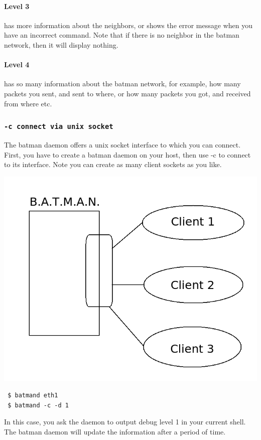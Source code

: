 \documentclass[
	12pt,
	a4paper,
	twoside,
	english,
	headsepline,
	footnosepline,
	automark,
	normalheadings,
	openany,
	cleardoubleplain,
	abstracton,
	idxtotoc,
	liststotoc,
	bibtotoc,
 	BCOR8mm,
]{scrartcl}
\newcommand{\subsubsectionttt}[1]{\subsubsection{\texttt{#1}}}
\begin{document}
\paragraph*{Level 3}
has more information about the neighbors, or shows the error message when  you  have an incorrect command. Note that if there is no neighbor in the batman network, then it  will display nothing.

\paragraph*{Level 4}
has so many information about the batman network, for example, how many packets  you sent, and sent to where, or how many packets you got, and received from where etc.

\subsubsectionttt{-c connect via unix socket}
The batman daemon offers a unix socket interface to which you can connect. First, you have to create a batman daemon on your host, then use  -c to connect to its  interface. Note you can create as many client sockets as you like.

\begin{center}
\includegraphics[scale=0.5]{multiple_clients}
\end{center}

\begin{verbatim}
 $ batmand eth1
 $ batmand -c -d 1
\end{verbatim}
 In this case, you ask the daemon to output debug level 1 in your current shell. The batman  daemon will update the information after a period of time.
\end{document}
